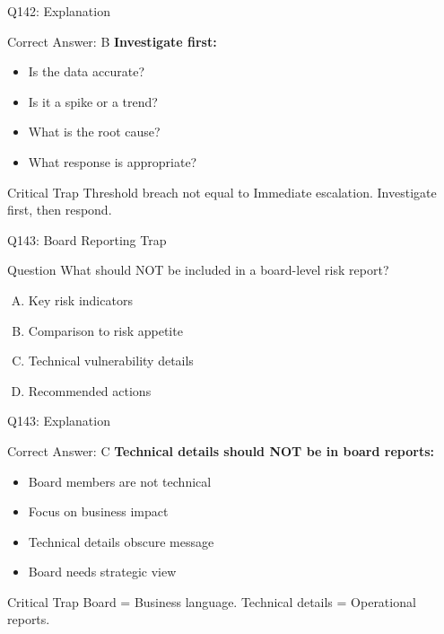 \documentclass{beamer}
\begin{document}
	\begin{frame}{Q142: Explanation}
		\begin{block}{Correct Answer: B}
			\textbf{Investigate first:}
			\begin{itemize}
				\item Is the data accurate?
				\item Is it a spike or a trend?
				\item What is the root cause?
				\item What response is appropriate?
			\end{itemize}
		\end{block}
		\begin{alertblock}{Critical Trap}
			Threshold breach not equal to Immediate escalation.
			Investigate first, then respond.
		\end{alertblock}
	\end{frame}
	
	\begin{frame}{Q143: Board Reporting Trap}
		\begin{block}{Question}
			What should NOT be included in a board-level risk report?
		\end{block}
		\begin{enumerate}[(A)]
			\item Key risk indicators
			\item Comparison to risk appetite
			\item Technical vulnerability details
			\item Recommended actions
		\end{enumerate}
	\end{frame}
	
	\begin{frame}{Q143: Explanation}
		\begin{block}{Correct Answer: C}
			\textbf{Technical details should NOT be in board reports:}
			\begin{itemize}
				\item Board members are not technical
				\item Focus on business impact
				\item Technical details obscure message
				\item Board needs strategic view
			\end{itemize}
		\end{block}
		\begin{alertblock}{Critical Trap}
			Board = Business language.
			Technical details = Operational reports.
		\end{alertblock}
	\end{frame}
	
\end{document}
